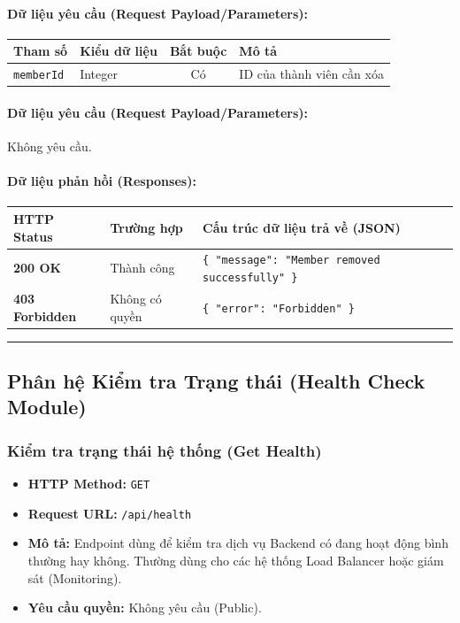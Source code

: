 \documentclass[12pt,a4paper]{article}
\begin{document}
\paragraph{Dữ liệu yêu cầu (Request Payload/Parameters):}
\begin{longtable}{|>{\raggedright\arraybackslash}p{2.8cm}|>{\raggedright\arraybackslash}p{2.2cm}|c|>{\raggedright\arraybackslash}p{7.0cm}|}
\hline
\textbf{Tham số} & \textbf{Kiểu dữ liệu} & \textbf{Bắt buộc} & \textbf{Mô tả} \\ \hline
\endhead
\texttt{memberId} & Integer & Có & ID của thành viên cần xóa \\ \hline
\end{longtable}

\paragraph{Dữ liệu yêu cầu (Request Payload/Parameters):}
Không yêu cầu.\\

\paragraph{Dữ liệu phản hồi (Responses):}
\begin{longtable}{|>{\raggedright\arraybackslash}p{2.8cm}|>{\raggedright\arraybackslash}p{3.2cm}|>{\raggedright\arraybackslash}p{8.0cm}|}
\hline
\textbf{HTTP Status} & \textbf{Trường hợp} & \textbf{Cấu trúc dữ liệu trả về (JSON)} \\ \hline
\endhead
\textbf{200 OK} & Thành công & \texttt{\{ "message": "Member removed successfully" \}} \\ \hline
\textbf{403 Forbidden} & Không có quyền & \texttt{\{ "error": "Forbidden" \}} \\ \hline
\end{longtable}

\vskip 0.4cm
\noindent\rule{\textwidth}{0.3pt}
\vskip 0.4cm

\subsection{Phân hệ Kiểm tra Trạng thái (Health Check Module)}

\subsubsection{Kiểm tra trạng thái hệ thống (Get Health)}
\begin{itemize}[leftmargin=*]
    \item \textbf{HTTP Method:} \texttt{GET}
    \item \textbf{Request URL:} \texttt{/api/health}
    \item \textbf{Mô tả:} Endpoint dùng để kiểm tra dịch vụ Backend có đang hoạt động bình thường hay không. Thường dùng cho các hệ thống Load Balancer hoặc giám sát (Monitoring).
    \item \textbf{Yêu cầu quyền:} Không yêu cầu (Public).
\end{itemize}
\end{document}
